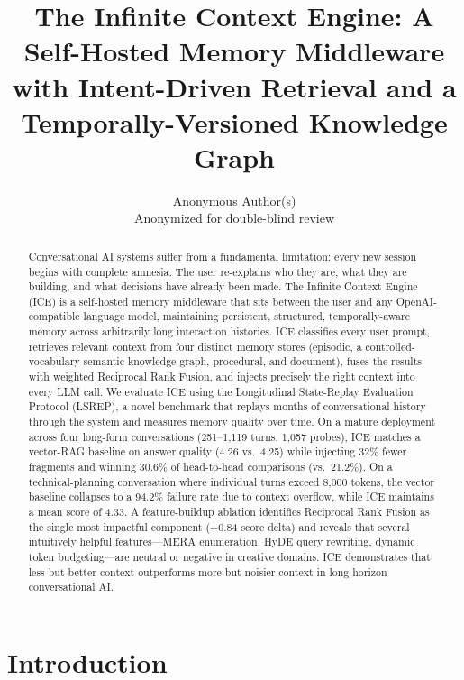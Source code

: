 \documentclass[10pt]{article}
\title{The Infinite Context Engine: A Self-Hosted Memory Middleware with Intent-Driven Retrieval and a Temporally-Versioned Knowledge Graph}
\author{\name Anonymous Author(s) \\ \addr Anonymized for double-blind review}
\begin{document}
\maketitle

\begin{abstract}
Conversational AI systems suffer from a fundamental limitation: every new session begins with complete amnesia. The user re-explains who they are, what they are building, and what decisions have already been made. The Infinite Context Engine (ICE) is a self-hosted memory middleware that sits between the user and any OpenAI-compatible language model, maintaining persistent, structured, temporally-aware memory across arbitrarily long interaction histories. ICE classifies every user prompt, retrieves relevant context from four distinct memory stores (episodic, a controlled-vocabulary semantic knowledge graph, procedural, and document), fuses the results with weighted Reciprocal Rank Fusion, and injects precisely the right context into every LLM call. We evaluate ICE using the Longitudinal State-Replay Evaluation Protocol (LSREP), a novel benchmark that replays months of conversational history through the system and measures memory quality over time. On a mature deployment across four long-form conversations (251--1{,}119 turns, 1{,}057 probes), ICE matches a vector-RAG baseline on answer quality (4.26 vs.\ 4.25) while injecting 32\% fewer fragments and winning 30.6\% of head-to-head comparisons (vs.\ 21.2\%). On a technical-planning conversation where individual turns exceed 8{,}000 tokens, the vector baseline collapses to a 94.2\% failure rate due to context overflow, while ICE maintains a mean score of 4.33. A feature-buildup ablation identifies Reciprocal Rank Fusion as the single most impactful component (+0.84 score delta) and reveals that several intuitively helpful features---MERA enumeration, HyDE query rewriting, dynamic token budgeting---are neutral or negative in creative domains. ICE demonstrates that less-but-better context outperforms more-but-noisier context in long-horizon conversational AI.
\end{abstract}

\section{Introduction}
\end{document}
